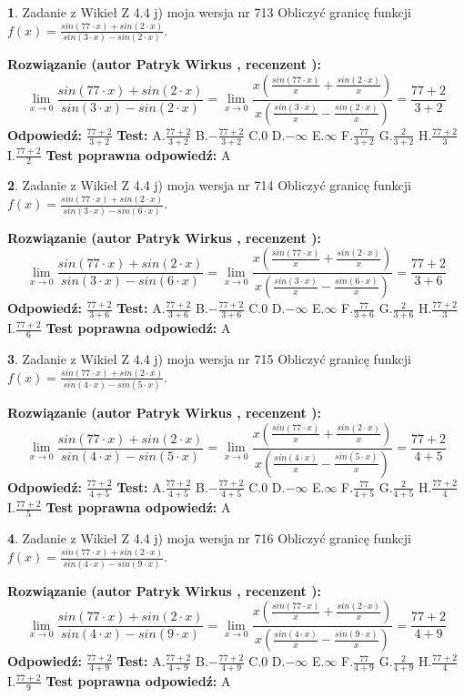 \documentclass[12pt, a4paper]{article}
\theoremstyle{definition} %
\newtheorem{zad}{}
\newcommand{\zadStart}[1]{\begin{zad}#1\newline}
\newcommand{\zadStop}{\end{zad}}
\newcommand{\rozwStart}[2]{\noindent \textbf{Rozwiązanie (autor #1 , recenzent #2): }\newline}
\newcommand{\rozwStop}{\newline}
\newcommand{\odpStart}{\noindent \textbf{Odpowiedź:}\newline}
\newcommand{\odpStop}{\newline}
\newcommand{\testStart}{\noindent \textbf{Test:}\newline}
\newcommand{\testStop}{\newline}
\newcommand{\kluczStart}{\noindent \textbf{Test poprawna odpowiedź:}\newline}
\newcommand{\kluczStop}{\newline}
\begin{document}
\zadStart{Zadanie z Wikieł Z 4.4 j) moja wersja nr 713}
Obliczyć granicę funkcji $f(x)=\frac{sin(77\cdot x) +sin(2\cdot x)}{sin(3\cdot x) -sin(2\cdot x)}$.
\zadStop
\rozwStart{Patryk Wirkus}{}
$$\lim\limits_{x\to 0}\frac{sin(77\cdot x) +sin(2\cdot x)}{sin(3\cdot x) -sin(2\cdot x)}=\lim\limits_{x\to 0}\frac{x(\frac{sin(77\cdot x)}{x}+\frac{sin(2\cdot x)}{x})}{x(\frac{sin(3\cdot x)}{x}-\frac{sin(2\cdot x)}{x})}=\frac{77+2}{3+2}$$
\rozwStop
\odpStart
$\frac{77+2}{3+2}$
\odpStop
\testStart
A.$\frac{77+2}{3+2}$
B.$-\frac{77+2}{3+2}$
C.$0$
D.$-\infty$
E.$\infty$
F.$\frac{77}{3+2}$
G.$\frac{2}{3+2}$
H.$\frac{77+2}{3}$
I.$\frac{77+2}{2}$
\testStop
\kluczStart
A
\kluczStop



\zadStart{Zadanie z Wikieł Z 4.4 j) moja wersja nr 714}
Obliczyć granicę funkcji $f(x)=\frac{sin(77\cdot x) +sin(2\cdot x)}{sin(3\cdot x) -sin(6\cdot x)}$.
\zadStop
\rozwStart{Patryk Wirkus}{}
$$\lim\limits_{x\to 0}\frac{sin(77\cdot x) +sin(2\cdot x)}{sin(3\cdot x) -sin(6\cdot x)}=\lim\limits_{x\to 0}\frac{x(\frac{sin(77\cdot x)}{x}+\frac{sin(2\cdot x)}{x})}{x(\frac{sin(3\cdot x)}{x}-\frac{sin(6\cdot x)}{x})}=\frac{77+2}{3+6}$$
\rozwStop
\odpStart
$\frac{77+2}{3+6}$
\odpStop
\testStart
A.$\frac{77+2}{3+6}$
B.$-\frac{77+2}{3+6}$
C.$0$
D.$-\infty$
E.$\infty$
F.$\frac{77}{3+6}$
G.$\frac{2}{3+6}$
H.$\frac{77+2}{3}$
I.$\frac{77+2}{6}$
\testStop
\kluczStart
A
\kluczStop



\zadStart{Zadanie z Wikieł Z 4.4 j) moja wersja nr 715}
Obliczyć granicę funkcji $f(x)=\frac{sin(77\cdot x) +sin(2\cdot x)}{sin(4\cdot x) -sin(5\cdot x)}$.
\zadStop
\rozwStart{Patryk Wirkus}{}
$$\lim\limits_{x\to 0}\frac{sin(77\cdot x) +sin(2\cdot x)}{sin(4\cdot x) -sin(5\cdot x)}=\lim\limits_{x\to 0}\frac{x(\frac{sin(77\cdot x)}{x}+\frac{sin(2\cdot x)}{x})}{x(\frac{sin(4\cdot x)}{x}-\frac{sin(5\cdot x)}{x})}=\frac{77+2}{4+5}$$
\rozwStop
\odpStart
$\frac{77+2}{4+5}$
\odpStop
\testStart
A.$\frac{77+2}{4+5}$
B.$-\frac{77+2}{4+5}$
C.$0$
D.$-\infty$
E.$\infty$
F.$\frac{77}{4+5}$
G.$\frac{2}{4+5}$
H.$\frac{77+2}{4}$
I.$\frac{77+2}{5}$
\testStop
\kluczStart
A
\kluczStop



\zadStart{Zadanie z Wikieł Z 4.4 j) moja wersja nr 716}
Obliczyć granicę funkcji $f(x)=\frac{sin(77\cdot x) +sin(2\cdot x)}{sin(4\cdot x) -sin(9\cdot x)}$.
\zadStop
\rozwStart{Patryk Wirkus}{}
$$\lim\limits_{x\to 0}\frac{sin(77\cdot x) +sin(2\cdot x)}{sin(4\cdot x) -sin(9\cdot x)}=\lim\limits_{x\to 0}\frac{x(\frac{sin(77\cdot x)}{x}+\frac{sin(2\cdot x)}{x})}{x(\frac{sin(4\cdot x)}{x}-\frac{sin(9\cdot x)}{x})}=\frac{77+2}{4+9}$$
\rozwStop
\odpStart
$\frac{77+2}{4+9}$
\odpStop
\testStart
A.$\frac{77+2}{4+9}$
B.$-\frac{77+2}{4+9}$
C.$0$
D.$-\infty$
E.$\infty$
F.$\frac{77}{4+9}$
G.$\frac{2}{4+9}$
H.$\frac{77+2}{4}$
I.$\frac{77+2}{9}$
\testStop
\kluczStart
A
\kluczStop
\end{document}
